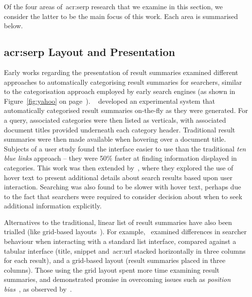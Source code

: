 Of the four areas of~\gls{acr:serp} research that we examine in this section, we consider the latter to be the main focus of this work. Each area is summarised below.

\subsection{\gls{acr:serp} Layout and Presentation}
Early works regarding the presentation of result summaries examined different approaches to automatically categorising result summaries for searchers, similar to the categorisation approach employed by early search engines (as shown in Figure~\ref{fig:yahoo} on page~\pageref{fig:yahoo}). ~\cite{chen2000order_to_web} developed an experimental system that automatically categorised result summaries on-the-fly as they were generated. For a query, associated categories were then listed as verticals, with associated document titles provided underneath each category header. Traditional result summaries were then made available when hovering over a document title. Subjects of a user study found the interface easier to use than the traditional \emph{ten blue links} approach -- they were 50\% faster at finding information displayed in categories. This work was then extended by~\cite{dumais2001results_in_context}, where they explored the use of hover text to present additional details about search results based upon user interaction. Searching was also found to be slower with hover text, perhaps due to the fact that searchers were required to consider decision about when to seek additional information explicitly.

Alternatives to the traditional, linear list of result summaries have also been trialled (like grid-based layouts~\citep{resnick2001modeling, kammerer2010interface, chierichetti2011two_dimensional_presentation}). For example,~\cite{kammerer2010interface} examined differences in searcher behaviour when interacting with a standard list interface, compared against a tabular interface (title, snippet and~\gls{acr:url} stacked horizontally in three columns for each result), and a grid-based layout (result summaries placed in three columns). Those using the grid layout spent more time examining result summaries, and demonstrated promise in overcoming issues such as \emph{position bias}~\citep{craswell2008click_models}, as observed by~\cite{joachims2005click_model}.


